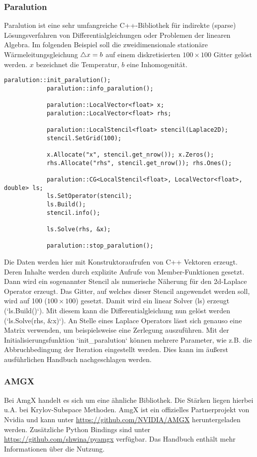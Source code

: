 			\subsubsection{Paralution}
			Paralution ist eine sehr umfangreiche C++-Bibliothek für indirekte (sparse) Lösungsverfahren von Differentialgleichungen oder Problemen der linearen Algebra. Im folgenden Beispiel soll die zweidimensionale stationäre Wärmeleitungsgleichung $\mathop{}\!\mathbin\bigtriangleup x = b$ auf einem diskretisierten $100\times 100$ Gitter gelöst werden. $x$ bezeichnet die Temperatur, $b$ eine Inhomogenität.
			\begin{lstlisting}[caption=Paralution Beispiel]		
			paralution::init_paralution();
			paralution::info_paralution();

			paralution::LocalVector<float> x;
			paralution::LocalVector<float> rhs;

			paralution::LocalStencil<float> stencil(Laplace2D);
			stencil.SetGrid(100);

			x.Allocate("x", stencil.get_nrow()); x.Zeros();
			rhs.Allocate("rhs", stencil.get_nrow()); rhs.Ones();

			paralution::CG<LocalStencil<float>, LocalVector<float>, double> ls;
			ls.SetOperator(stencil);
			ls.Build();
			stencil.info();

			ls.Solve(rhs, &x);

			paralution::stop_paralution();
			\end{lstlisting}
			
			Die Daten werden hier mit Konstruktoraufrufen von C++ Vektoren erzeugt. Deren Inhalte werden durch explizite Aufrufe von Member-Funktionen gesetzt. Dann wird ein sogenannter Stencil als numerische Näherung für den 2d-Laplace Operator erzeugt. Das Gitter, auf welches dieser Stencil angewendet werden soll, wird auf 100 ($100\times 100$) gesetzt. Damit wird ein linear Solver (ls) erzeugt (\li`ls.Build()`). Mit diesem kann die Differentialgleichung nun gelöst werden (\li`ls.Solve(rhs, &x)`). An Stelle eines Laplace Operators lässt sich genauso eine Matrix verwenden, um beispielsweise eine Zerlegung auszuführen. Mit der Initialisierungsfunktion \li`init_paralution` können mehrere Parameter, wie z.B. die Abbruchbedingung der Iteration eingestellt werden. Dies kann im äußerst ausführlichen Handbuch nachgeschlagen werden. \autocite{para}
			 
			\subsubsection{AMGX}	
			Bei AmgX handelt es sich um eine ähnliche Bibliothek. Die Stärken liegen hierbei u.A. bei Krylov-Subspace Methoden. AmgX ist ein offizielles Partnerprojekt von Nvidia und kann unter \url{https://github.com/NVIDIA/AMGX} heruntergeladen werden. Zusätzliche Python Bindings sind unter \url{https://github.com/shwina/pyamgx} verfügbar. Das Handbuch enthält mehr Informationen über die Nutzung. \autocite{amgx}	
			
